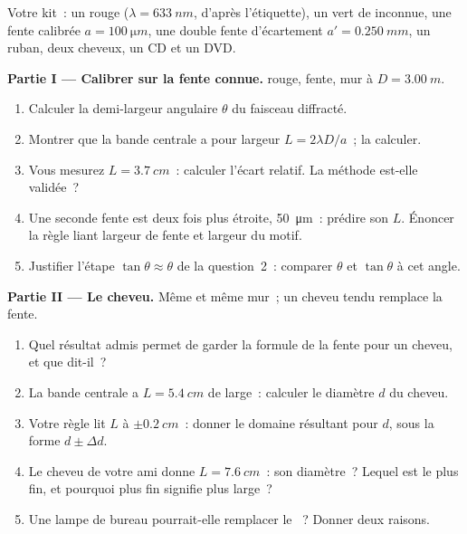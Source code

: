 \begin{problem}
\label{pb:g12:light-as-wave:1}
Votre kit~: un  rouge ($\lambda = \qty{633}{nm}$,
d'après l'étiquette), un  vert de
 inconnue, une fente calibrée
$a = \qty{100}{\micro m}$, une double fente d'écartement
$a' = \qty{0.250}{mm}$, un  ruban, deux cheveux, un CD et un DVD.

\medskip
\noindent\textbf{Partie I --- Calibrer sur la fente connue.}
 rouge, fente, mur à $D = \qty{3.00}{m}$.
\begin{enumerate}
  \item Calculer la demi-largeur angulaire $\theta$ du faisceau
        diffracté.
  \item Montrer que la bande centrale a pour largeur $L = 2\lambda D/a$~;
        la calculer.
  \item Vous mesurez $L = \qty{3.7}{cm}$~: calculer l'écart relatif. La
        méthode est-elle validée~?
  \item Une seconde fente est deux fois plus étroite, \qty{50}{\micro m}~:
        prédire son $L$. Énoncer la règle liant largeur de fente et
        largeur du motif.
  \item Justifier l'étape $\tan\theta \approx \theta$ de la question~2~:
        comparer $\theta$ et $\tan\theta$ à cet angle.
\end{enumerate}

\medskip
\noindent\textbf{Partie II --- Le cheveu.} Même
 et même mur~; un cheveu tendu remplace la fente.
\begin{enumerate}[resume]
  \item Quel résultat admis permet de garder la formule de la fente pour
        un cheveu, et que dit-il~?
  \item La bande centrale a $L = \qty{5.4}{cm}$ de large~: calculer le
        diamètre $d$ du cheveu.
  \item Votre règle lit $L$ à $\pm\qty{0.2}{cm}$~: donner le
        domaine résultant pour $d$, sous la forme
        $d \pm \Delta d$.
  \item Le cheveu de votre ami donne $L = \qty{7.6}{cm}$~: son diamètre~?
        Lequel est le plus fin, et pourquoi plus fin signifie plus large~?
  \item Une lampe de bureau pourrait-elle remplacer le
        ~? Donner deux raisons.
\end{enumerate}


\end{problem}
